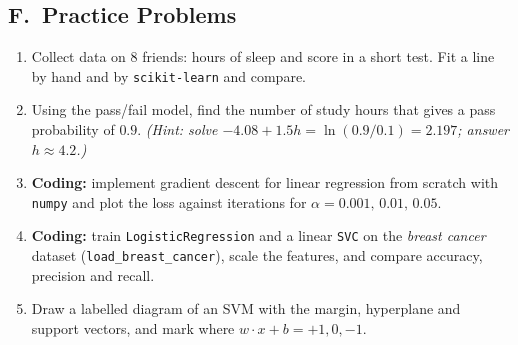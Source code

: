 \subsection*{F.\ Practice Problems}
\begin{enumerate}
  \item Collect data on 8 friends: hours of sleep and score in a short test. Fit a line by hand and by \texttt{scikit-learn} and compare.
  \item Using the pass/fail model, find the number of study hours that gives a pass probability of $0.9$. \textit{(Hint: solve $-4.08+1.5h=\ln(0.9/0.1)=2.197$; answer $h\approx4.2$.)}
  \item \textbf{Coding:} implement gradient descent for linear regression from scratch with \texttt{numpy} and plot the loss against iterations for $\alpha=0.001,\,0.01,\,0.05$.
  \item \textbf{Coding:} train \texttt{LogisticRegression} and a linear \texttt{SVC} on the \emph{breast cancer} dataset (\texttt{load\_breast\_cancer}), scale the features, and compare accuracy, precision and recall.
  \item Draw a labelled diagram of an SVM with the margin, hyperplane and support vectors, and mark where $w\cdot x+b=+1,0,-1$.
\end{enumerate}

